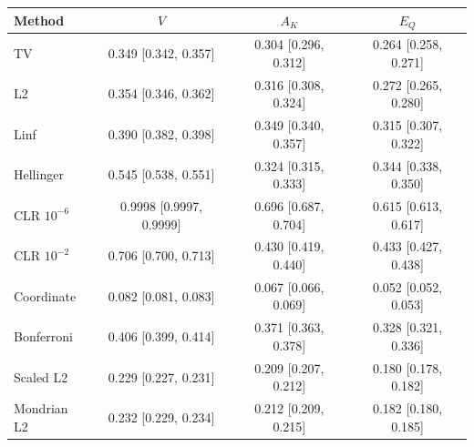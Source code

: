 \begin{tabular}{lccc}
\toprule
Method & $V$ & $A_K$ & $E_Q$ \\
\midrule
TV & 0.349 [0.342, 0.357] & 0.304 [0.296, 0.312] & 0.264 [0.258, 0.271] \\
L2 & 0.354 [0.346, 0.362] & 0.316 [0.308, 0.324] & 0.272 [0.265, 0.280] \\
Linf & 0.390 [0.382, 0.398] & 0.349 [0.340, 0.357] & 0.315 [0.307, 0.322] \\
Hellinger & 0.545 [0.538, 0.551] & 0.324 [0.315, 0.333] & 0.344 [0.338, 0.350] \\
CLR $10^{-6}$ & 0.9998 [0.9997, 0.9999] & 0.696 [0.687, 0.704] & 0.615 [0.613, 0.617] \\
CLR $10^{-2}$ & 0.706 [0.700, 0.713] & 0.430 [0.419, 0.440] & 0.433 [0.427, 0.438] \\
Coordinate & 0.082 [0.081, 0.083] & 0.067 [0.066, 0.069] & 0.052 [0.052, 0.053] \\
Bonferroni & 0.406 [0.399, 0.414] & 0.371 [0.363, 0.378] & 0.328 [0.321, 0.336] \\
Scaled L2 & 0.229 [0.227, 0.231] & 0.209 [0.207, 0.212] & 0.180 [0.178, 0.182] \\
Mondrian L2 & 0.232 [0.229, 0.234] & 0.212 [0.209, 0.215] & 0.182 [0.180, 0.185] \\
\bottomrule
\end{tabular}
